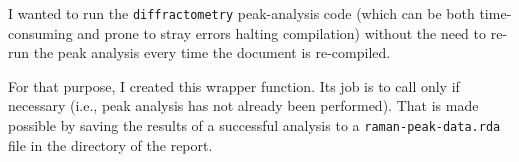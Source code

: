 I wanted to run the \texttt{diffractometry} peak-analysis code (which can be both time-consuming and prone to stray errors halting compilation) without the need to re-run the peak analysis every time the document is re-compiled.

For that purpose, I created this wrapper function.
Its job is to call  only if necessary (i.e., peak analysis has not already been performed). That is made possible by saving the results of a successful analysis to a \texttt{raman-peak-data.rda} file in the directory of the report.

